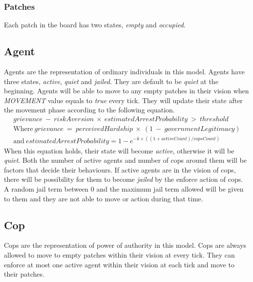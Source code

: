 \documentclass[11pt]{article}
\begin{document}
        \subsubsection{Patches}
        Each patch in the board has two states, \textit{empty} and \textit{occupied}.
        \subsection{Agent}
        Agents are the representation of ordinary individuals in this model. Agents
        have three states, \textit{active}, \textit{quiet} and \textit{jailed}. 
        They are default to be \textit{quiet} at the beginning. Agents will be able
        to move to any empty patches in their vision when \textit{MOVEMENT} value
        equals to \textit{true} every tick. They will update their state after the
        movement phase according to the following equation.
        \begin{equation}
            \begin{split}
                grievance\:-\:riskAversion\:\times\:estimatedArrestProbability\:>\:threshold \\
                \text{Where}\ grievance\:=\:perceivedHardship\:\times\:(1\:-\:governmentLegitimacy)\\
                \text{and}\ estimatedArrestProbability = 1 - e^{-k \times ((1 + activeCount) / copsCount)}
            \end{split}
        \end{equation}  
        When this equation holds, their state will become \textit{active}, otherwise
        it will be \textit{quiet}. Both the number of active agents and number of
        cops around them will be factors that decide their behaviours.
        If active agents are in the vision of cops, there
        will be possibility for them to become \textit{jailed} by the enforce action
        of cops. A random jail term between 0 and the maximum jail term allowed will
        be given to them and they are not able to move or action during that time.
        \subsection{Cop}
        Cops are the representation of power of authority in this model. Cops
        are always allowed to move to empty patches within their vision at 
        every tick. They can enforce at most one active agent within their vision
        at each tick and move to their patches.
\end{document}
